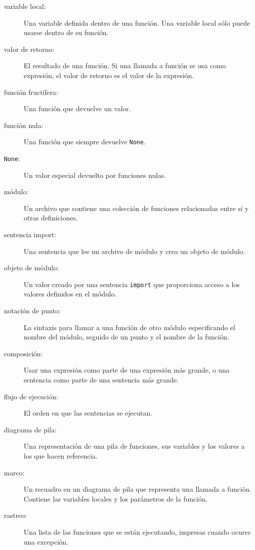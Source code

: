 \documentclass[10pt]{book}
\begin{document}
\begin{description}
\item[variable local:]  Una variable definida dentro de una función. Una variable
local sólo puede usarse dentro de su función.

\item[valor de retorno:]  El resultado de una función.  Si una llamada a función
se usa como expresión, el valor de retorno es el valor de
la expresión.

\item[función fructífera:] Una función que devuelve un valor.

\item[función nula:] Una función que siempre devuelve {\tt None}.

\item[{\tt None}:]  Un valor especial devuelto por funciones nulas.

\item[módulo:] Un archivo que contiene una
colección de funciones relacionadas entre sí y otras definiciones.

\item[sentencia import:] Una sentencia que lee un archivo de módulo y crea
un objeto de módulo.

\item[objeto de módulo:] Un valor creado por una sentencia {\tt import}
que proporciona acceso a los valores definidos en el módulo.

\item[notación de punto:]  La sintaxis para llamar a una función de otro
módulo especificando el nombre del módulo, seguido de un punto y
el nombre de la función.

\item[composición:] Usar una expresión como parte de una expresión más grande,
o una sentencia como parte de una sentencia más grande.

\item[flujo de ejecución:]  El orden en que las sentencias se ejecutan.

\item[diagrama de pila:]  Una representación de una pila de funciones,
sus variables y los valores a los que hacen referencia.

\item[marco:]  Un recuadro en un diagrama de pila que representa una llamada a función.
Contiene las variables locales y los parámetros de la función.

\item[rastreo:]  Una lista de las funciones que se están ejecutando,
impresas cuando ocurre una excepción.


\end{description}
\end{document}

